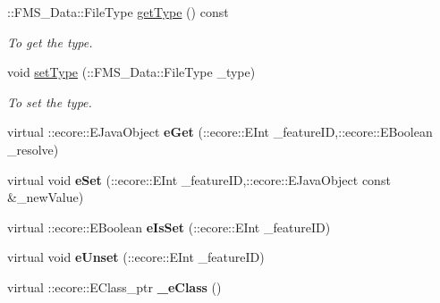 \begin{DoxyCompactItemize}
::FMS\_\-Data::FileType \hyperlink{classFMS__Data_1_1FileStat_aaf5ae58a87418650f8790b9b112c64a2}{getType} () const 
\begin{DoxyCompactList}\small\item\em To get the type. \item\end{DoxyCompactList}\item 
void \hyperlink{classFMS__Data_1_1FileStat_ad321ebaa33a2747ebedf38bd8db15895}{setType} (::FMS\_\-Data::FileType \_\-type)
\begin{DoxyCompactList}\small\item\em To set the type. \item\end{DoxyCompactList}\item 
\hypertarget{classFMS__Data_1_1FileStat_a18bc26d09b403d19cb0fc3167be8e536}{
virtual ::ecore::EJavaObject {\bfseries eGet} (::ecore::EInt \_\-featureID,::ecore::EBoolean \_\-resolve)}
\label{classFMS__Data_1_1FileStat_a18bc26d09b403d19cb0fc3167be8e536}

\item 
\hypertarget{classFMS__Data_1_1FileStat_add98ff0df77abdc217104d9dcff65db2}{
virtual void {\bfseries eSet} (::ecore::EInt \_\-featureID,::ecore::EJavaObject const \&\_\-newValue)}
\label{classFMS__Data_1_1FileStat_add98ff0df77abdc217104d9dcff65db2}

\item 
\hypertarget{classFMS__Data_1_1FileStat_ab0a8ac764d2e20558260d7c7c43558c2}{
virtual ::ecore::EBoolean {\bfseries eIsSet} (::ecore::EInt \_\-featureID)}
\label{classFMS__Data_1_1FileStat_ab0a8ac764d2e20558260d7c7c43558c2}

\item 
\hypertarget{classFMS__Data_1_1FileStat_a1e0ccc63fd90e04e744571cf1dc17bc7}{
virtual void {\bfseries eUnset} (::ecore::EInt \_\-featureID)}
\label{classFMS__Data_1_1FileStat_a1e0ccc63fd90e04e744571cf1dc17bc7}

\item 
\hypertarget{classFMS__Data_1_1FileStat_a2e65ea822f395a3774e5b44263f64ecb}{
virtual ::ecore::EClass\_\-ptr {\bfseries \_\-eClass} ()}
\label{classFMS__Data_1_1FileStat_a2e65ea822f395a3774e5b44263f64ecb}

\end{DoxyCompactItemize}
